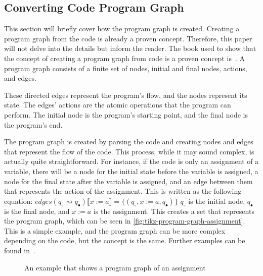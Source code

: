 \subsection{Converting Code Program Graph}\label{subsection:converting-code-program-graph}
This section will briefly cover how the program graph is created.
Creating a program graph from the code is already a proven concept. Therefore, this paper will not delve into the details but inform the reader.
The book used to show that the concept of creating a program graph from code is a proven concept is~\cite[see][chap 2.2]{nielson_formal_2019}.
A program graph consists of a finite set of nodes, initial and final nodes, actions, and edges.

These directed edges represent the program's flow, and the nodes represent its state. The edges' actions are the atomic operations that the program can perform. The initial node is the program's starting point, and the final node is the program's end.

The program graph is created by parsing the code and creating nodes and edges that represent the flow of the code. This process, while it may sound complex, is actually quite straightforward. For instance, if the code is only an assignment of a variable, there will be a node for the initial state before the variable is assigned, a node for the final state after the variable is assigned, and an edge between them that represents the action of the assignment. This is written as the following equation:
$edges(q_{\circ} \rightsquigarrow q_{\bullet})\llbracket x:=a \rrbracket = \{(q_{\circ}, x:=a, q_{\bullet})\}$
$q_{\circ}$ is the initial node, $q_{\bullet}$ is the final node, and $x:=a$ is the assignment. This creates a set that represents the program graph, which can be seen in \autoref{fig:tikz-program-graph-assignment}. This is a simple example, and the program graph can be more complex depending on the code, but the concept is the same.
Further examples can be found in~\cite[Figure 2.6]{nielson_formal_2019}.

\begin{figure}[htb!]
    \center
    
    \caption{An example that shows a program graph of an assignment}
    \label{fig:tikz-program-graph-assignment}
\end{figure}    